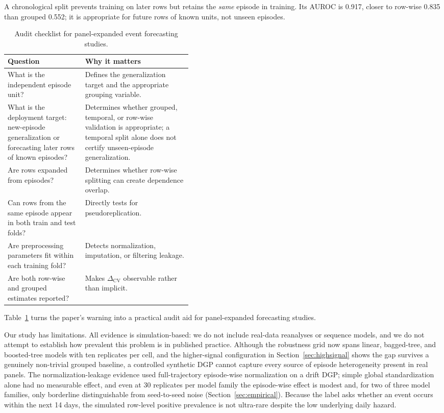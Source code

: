 \documentclass[runningheads]{llncs}
\newcommand{\1}{\mathbf{1}}
\begin{document}
A chronological split prevents training on later rows but retains the \emph{same} episode in training. Its AUROC is 0.917, closer to row-wise 0.835 than grouped 0.552; it is appropriate for future rows of known units, not unseen episodes.

\begin{table}[t]
\centering
\caption{Audit checklist for panel-expanded event forecasting studies.}\label{tab:audit-checklist}
\footnotesize
\setlength{\tabcolsep}{4pt}
\renewcommand{\arraystretch}{1.0}
\begin{tabularx}{0.98\linewidth}{p{0.42\linewidth}X}
\toprule
\textbf{Question} & \textbf{Why it matters} \\
\midrule
What is the independent episode unit? & Defines the generalization target and the appropriate grouping variable. \\
What is the deployment target: new-episode generalization or forecasting later rows of known episodes? & Determines whether grouped, temporal, or row-wise validation is appropriate; a temporal split alone does not certify unseen-episode generalization. \\
Are rows expanded from episodes? & Determines whether row-wise splitting can create dependence overlap. \\
Can rows from the same episode appear in both train and test folds? & Directly tests for pseudoreplication. \\
Are preprocessing parameters fit within each training fold? & Detects normalization, imputation, or filtering leakage. \\
Are both row-wise and grouped estimates reported? & Makes $\Delta_{\mathrm{CV}}$ observable rather than implicit. \\
\bottomrule
\end{tabularx}
\end{table}

Table~\ref{tab:audit-checklist} turns the paper's warning into a practical audit aid for panel-expanded forecasting studies.

Our study has limitations. All evidence is simulation-based: we do not include real-data reanalyses or sequence models, and we do not attempt to establish how prevalent this problem is in published practice. Although the robustness grid now spans linear, bagged-tree, and boosted-tree models with ten replicates per cell, and the higher-signal configuration in Section~\ref{sec:highsignal} shows the gap survives a genuinely non-trivial grouped baseline, a controlled synthetic DGP cannot capture every source of episode heterogeneity present in real panels. The normalization-leakage evidence used full-trajectory episode-wise normalization on a drift DGP; simple global standardization alone had no measurable effect, and even at 30 replicates per model family the episode-wise effect is modest and, for two of three model families, only borderline distinguishable from seed-to-seed noise (Section~\ref{sec:empirical}). Because the label asks whether an event occurs within the next 14 days, the simulated row-level positive prevalence is not ultra-rare despite the low underlying daily hazard.
\end{document}

